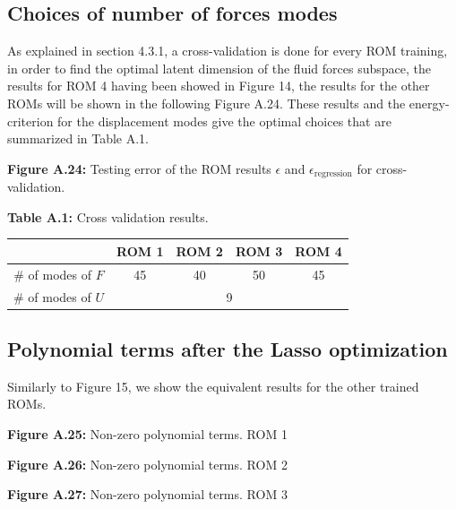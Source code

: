 \documentclass[11pt]{article}
\begin{document}
\subsection{Choices of number of forces modes}

As explained in section 4.3.1, a cross-validation is done for every ROM training, in order to find the optimal latent dimension of the fluid forces subspace, the results for ROM 4 having been showed in Figure 14, the results for the other ROMs will be shown in the following Figure A.24. These results and the energy-criterion for the displacement modes give the optimal choices that are summarized in Table A.1.

\begin{center}
\textbf{Figure A.24:} Testing error of the ROM results $\epsilon$ and $\epsilon_{\mathrm{regression}}$ for cross-validation.
\end{center}

\begin{center}
\textbf{Table A.1:} Cross validation results.
\end{center}

\begin{center}
\begin{tabular}{|c|c|c|c|c|}
\hline
 & \textbf{ROM 1} & \textbf{ROM 2} & \textbf{ROM 3} & \textbf{ROM 4} \\
\hline
\# of modes of $F$ & 45 & 40 & 50 & 45 \\
\hline
\# of modes of $U$ & \multicolumn{4}{c|}{9} \\
\hline
\end{tabular}
\end{center}

\subsection{Polynomial terms after the Lasso optimization}

Similarly to Figure 15, we show the equivalent results for the other trained ROMs.

\begin{center}
\textbf{Figure A.25:} Non-zero polynomial terms. ROM 1
\end{center}

\begin{center}
\textbf{Figure A.26:} Non-zero polynomial terms. ROM 2
\end{center}

\begin{center}
\textbf{Figure A.27:} Non-zero polynomial terms. ROM 3
\end{center}
\end{document}
